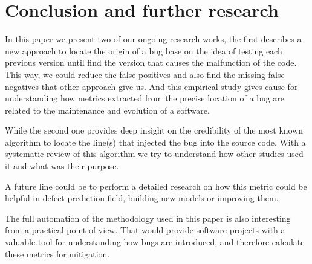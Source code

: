 \documentclass[10pt, conference]{IEEEtran}
\begin{document}
\section{Conclusion and further research}
\label{sec:conclusions}

In this paper we present two of our ongoing research works, the first describes a new approach to locate the origin of a bug base on the idea of testing each previous version until find the version that causes the malfunction of the code. This way, we could reduce the false positives and also find the missing false negatives that other approach give us. And this empirical study gives cause for understanding how
metrics extracted from the precise location of a bug are related to the maintenance and evolution of a software.

While the second one provides deep insight on the credibility of the most known algorithm to locate the line(s) that injected the bug into the source code. With a systematic review of this algorithm we try to understand how other studies used it and what was their purpose.

A future line could be to perform a detailed research on how this metric could be helpful in defect prediction field, building new models or improving them.

The full automation of the methodology used in this paper is also interesting from a practical point of view. That would provide software projects with a valuable tool for understanding how bugs are introduced, and therefore calculate these metrics for mitigation.


%
%
%




 


\end{document}

